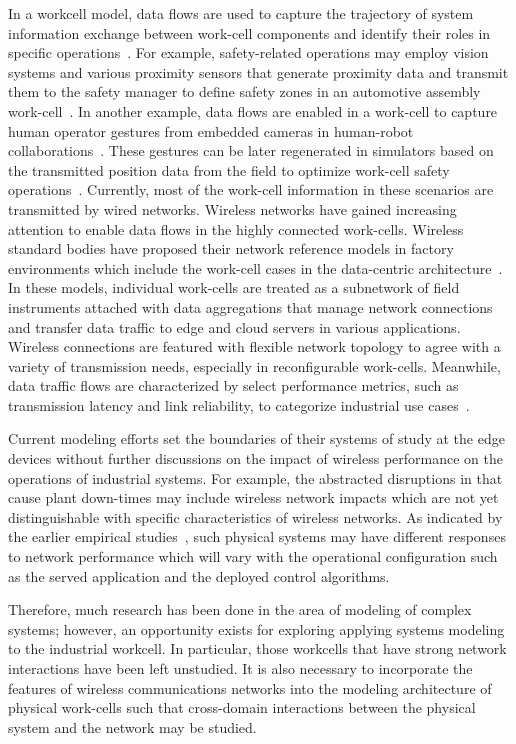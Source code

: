 In a workcell model, data flows are used to capture the trajectory of system information exchange between work-cell components and identify their roles in specific operations~\cite{OpenArch}. For example, safety-related operations may employ vision systems and various proximity sensors that generate proximity data and transmit them to the safety manager to define safety zones in an automotive assembly work-cell~\cite{safeeye}. 
In another example, data flows are enabled in a work-cell to capture human operator gestures from embedded cameras in human-robot collaborations~\cite{cobotcell}. These gestures can be later regenerated in simulators based on the transmitted position data from the field to optimize work-cell safety operations~\cite{gesture}. Currently, most of the work-cell information in these scenarios are transmitted by wired networks. Wireless networks have gained increasing attention to enable data flows in the highly connected work-cells. Wireless standard bodies have proposed their network reference models in factory environments which include the work-cell cases in the data-centric architecture~\cite{ETSI889, KPItable}. In these models, individual work-cells are treated as a subnetwork of field instruments attached with data aggregations that manage network connections and transfer data traffic to edge and cloud servers in various applications. Wireless connections are featured with flexible network topology to agree with a variety of transmission needs, especially in reconfigurable work-cells. Meanwhile, data traffic flows are characterized by select performance metrics, such as transmission latency and link reliability, to categorize industrial use cases~\cite{KPItable}. 

Current modeling efforts set the boundaries of their systems of study at the edge devices without further discussions on the impact of wireless performance on the operations of industrial systems. For example, the abstracted disruptions in \cite{QChang,Liu2012} that cause plant down-times may include wireless network impacts which are not yet distinguishable with specific characteristics of wireless networks. As indicated by the earlier empirical studies~\cite{Liu2016}, such physical systems may have different responses to network performance which will vary with the operational configuration such as the served application and the deployed control algorithms. 

Therefore, much research has been done in the area of modeling of complex systems; however, an opportunity exists for exploring applying systems modeling to the industrial workcell.  In particular, those workcells that have strong network interactions have been left unstudied.  It is also necessary to incorporate the features of wireless communications networks into the modeling architecture of physical work-cells such that cross-domain interactions between the physical system and the network may be studied.  

